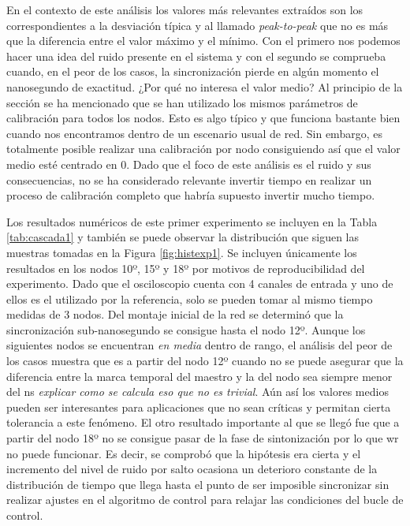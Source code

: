 En el contexto de este análisis los valores más relevantes extraídos son los 
correspondientes a la desviación típica y al llamado \textit{peak-to-peak} que 
no es más que la diferencia entre el valor máximo y el mínimo. Con el primero 
nos podemos hacer una idea del ruido presente en el sistema y con el segundo se 
comprueba cuando, en el peor de los casos, la sincronización pierde en algún 
momento el nanosegundo de exactitud. ¿Por qué no interesa el valor medio? Al 
principio de la sección se ha mencionado que se han utilizado los mismos 
parámetros de calibración para todos los nodos. Esto es algo típico y que 
funciona bastante bien cuando nos encontramos dentro de un escenario usual de 
red. Sin embargo, es totalmente posible realizar una calibración por nodo 
consiguiendo así que el valor medio esté centrado en 0. Dado que el foco de 
este análisis es el ruido y sus consecuencias, no se ha considerado relevante 
invertir tiempo en realizar un proceso de calibración completo que habría 
supuesto invertir mucho tiempo.

Los resultados numéricos de este primer experimento se incluyen en la Tabla 
\ref{tab:cascada1} y también se puede observar la distribución que siguen las 
muestras tomadas en la Figura \ref{fig:histexp1}. Se incluyen únicamente los 
resultados en los nodos 10º, 15º y 18º por motivos de reproducibilidad del 
experimento. Dado que el osciloscopio cuenta con 4 canales de entrada y uno de 
ellos es el utilizado por la referencia, solo se pueden tomar al mismo tiempo 
medidas de 3 nodos.
Del montaje inicial de la red se determinó que la sincronización 
sub-nanosegundo se consigue hasta el nodo 12º. Aunque los siguientes nodos se 
encuentran \textit{en media} dentro de rango, el análisis del peor de los casos 
muestra que es a partir del nodo 12º cuando no se puede asegurar que la 
diferencia entre la marca temporal del maestro y la del nodo sea siempre menor 
del ns \textit{explicar como se calcula eso que no es trivial}. Aún así los 
valores medios pueden ser interesantes para aplicaciones 
que no sean críticas y permitan cierta tolerancia a este fenómeno.
El otro resultado importante al que se llegó fue que a partir del nodo 18º no 
se consigue pasar de la fase de sintonización por lo que \gls{wr} no puede 
funcionar. Es decir, se comprobó que la hipótesis era cierta y el incremento 
del nivel de ruido por salto ocasiona un deterioro constante de la distribución 
de tiempo que llega hasta el punto de ser imposible sincronizar sin realizar 
ajustes en el algoritmo de control para relajar las condiciones del bucle de 
control.

